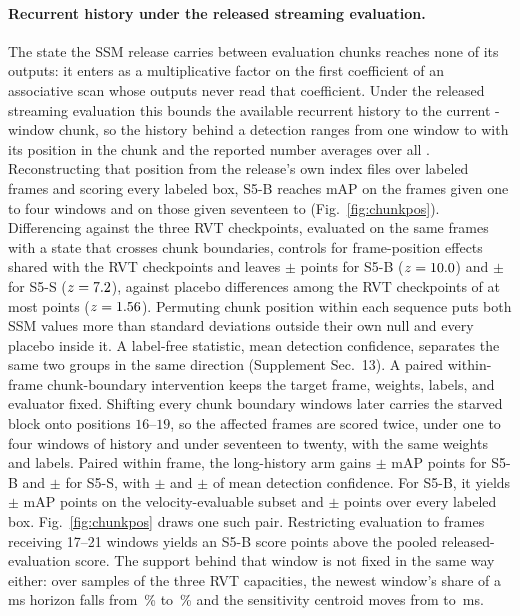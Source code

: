 \documentclass[10pt,twocolumn,letterpaper]{article}
\begin{document}
\paragraph{Recurrent history under the released streaming evaluation.}
The state the SSM release carries between evaluation chunks reaches none of its
outputs: it enters as a multiplicative factor on the first coefficient of an
associative scan whose outputs never read that coefficient. Under the released
streaming evaluation this bounds the available recurrent history to the current
\ssmEvalChunk{}-window chunk, so the history behind a detection ranges from one window
to \ssmEvalChunk{} with its position in the chunk and the reported number averages over
all \ssmEvalChunk{}. Reconstructing that position from the release's own index files
over \mapFrames{} labeled frames and scoring every labeled box, S5-B reaches
\chunkShortBase{} mAP on the frames given one to four windows and \chunkFullBase{} on
those given seventeen to \ssmEvalChunk{} (Fig.~\ref{fig:chunkpos}). Differencing against the three RVT
checkpoints, evaluated on the same frames with a state that crosses chunk boundaries,
controls for frame-position effects shared with the RVT checkpoints and leaves
\chunkDidBase$\pm$\chunkDidBaseSE{} points for S5-B
($z=10.0$) and \chunkDidSmall$\pm$\chunkDidSmallSE{} for S5-S
($z=7.2$), against placebo differences among the RVT checkpoints of at most
\chunkPlaceboMax{} points ($z=1.56$). Permuting chunk position within each
sequence puts both SSM values more than \chunkPermZSmall{} standard deviations outside
their own null and every placebo inside it. A label-free statistic, mean detection
confidence, separates the same two groups in the same direction (Supplement
Sec.~13). A paired within-frame chunk-boundary intervention keeps the target frame, weights,
labels, and evaluator fixed. Shifting every chunk boundary \ssmPairedShift{} windows later carries the starved block onto positions
$16$--$19$, so the \ssmPairedN{} affected frames are scored twice, under one to four
windows of history and under seventeen to twenty, with the same weights and labels.
Paired within frame, the long-history arm gains
\ssmPairedMapVelBase$\pm$\ssmPairedMapVelBaseSE{} mAP points for S5-B and
\ssmPairedMapVelSmall$\pm$\ssmPairedMapVelSmallSE{} for S5-S, with
\ssmPairedConfBase$\pm$\ssmPairedConfBaseSE{} and
\ssmPairedConfSmall$\pm$\ssmPairedConfSmallSE{} of mean detection confidence. For S5-B, it yields
\ssmPairedMapVelBase$\pm$\ssmPairedMapVelBaseSE{} mAP points on the velocity-evaluable
subset and \ssmPairedMapAllBase$\pm$\ssmPairedMapAllBaseSE{} points over every labeled box.
Fig.~\ref{fig:chunkpos} draws one
such pair. Restricting evaluation to frames receiving 17--21 windows yields an S5-B score
\chunkGapBase{} points above the pooled released-evaluation score. The support behind that
window is not fixed in the same way either: over \capSamples{} samples of the
three RVT capacities, the newest window's share of a \capHorizon\,ms horizon
falls from \capShareT\,\% to \capShareB\,\% and the sensitivity centroid moves
from \capSuppT{} to \capSuppB\,ms.
\end{document}
